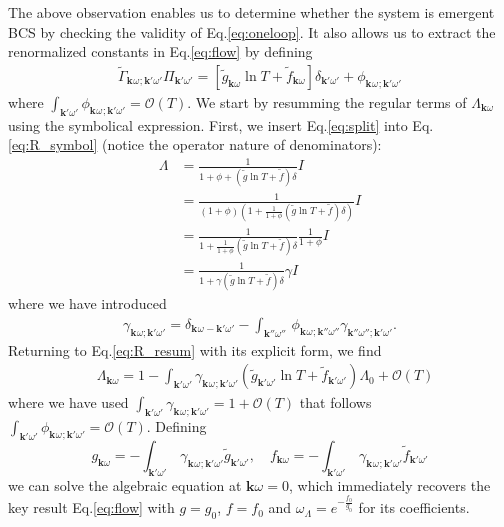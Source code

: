 \documentclass[%
 reprint,
superscriptaddress,
 amsmath,amssymb,
 aps,
prx,
]{revtex4-2}
\newcommand{\bk}{\mathbf{k}}
\newcommand{\Gammapp}{\tilde{\Gamma}}
\newcommand{\pcf}{\Lambda} %
\begin{document}
\begin{appendices}
The above observation enables us to determine whether the system is emergent BCS by
checking the validity of Eq.\eqref{eq:oneloop}. It also allows us to extract the renormalized
constants in Eq.\eqref{eq:flow} by defining 
\begin{gather}
	\label{eq:split}
	\Gammapp_{\bk^{}\omega^{};\bk'\omega'}\Pi_{\bk'\omega'}=\left[\tilde{g}_{\bk\omega} \ln T + \tilde{f}_{\bk\omega}\right] \delta_{\bk'\omega'} + \phi_{\bk^{}\omega^{};\bk'\omega'}
\end{gather}
where $ \int_{\bk'\omega'} \phi_{\bk^{}\omega^{};\bk'\omega'} = \mathcal O(T)$.
We start by resumming the regular terms of $\pcf_{\bk\omega}$ using the symbolical
expression. First, we insert Eq.\eqref{eq:split} into Eq.\eqref{eq:R_symbol}
(notice the operator nature of denominators): 
\begin{align}
	\pcf &=\frac{1}{1+\phi+(\tilde{g}\ln{T}+\tilde{f})\delta}I\nonumber\\ 
    &=\frac{1}{(1+\phi)\left(1+\frac{1}{1+\phi}(\tilde{g}\ln{T}+\tilde{f})\delta\right)}I\nonumber\\
  &=\frac{1}{1+\frac{1}{1+\phi}(\tilde{g}\ln{T}+\tilde{f})\delta}\frac{1}{1+\phi}I\nonumber\\
  &= \frac{1}{1+ \gamma (\tilde{g}\ln{T}+\tilde{f})\delta} \gamma I
  \label{eq:R_resum}  
\end{align}
where we have introduced
\begin{align}
\label{eq:gamma}
\gamma_{\bk^{}\omega; \bk'\omega'} =\delta_{\bk^{}\omega^{}-\bk'\omega'} -  \int_{\bk''\omega''} \, \phi_{\bk^{}\omega^{};\bk''\omega''}\gamma_{\bk''\omega'';\bk'\omega'}.
\end{align}
Returning to Eq.\eqref{eq:R_resum} with its explicit form, we find
\begin{align}
	\label{eq:LR_full}
	&\pcf_{\bk\omega}=1-\int_{\bk'\omega'} \gamma_{\bk^{}\omega^{};\bk'\omega'}\left(\tilde{g}_{\bk'\omega'}\ln {T}+ \tilde{f}_{\bk'\omega'}\right) \pcf_0 + \mathcal O(T)
\end{align}
where we have used $\int_{\bk'\omega'} \gamma_{\bk^{}\omega^{};\bk'\omega'} = 1+\mathcal O(T)$ that follows $ \int_{\bk'\omega'} \phi_{\bk^{}\omega^{};\bk'\omega'} = \mathcal O(T)$. Defining 
 \begin{equation}
\label{eq:R_final}
g_{\bk\omega} = -\int_{\bk'\omega'}\,  \gamma_{\bk^{}\omega^{};\bk'\omega'}\tilde{g}_{\bk'\omega'}, \quad  f_{\bk\omega} = -\int_{\bk'\omega'}\,  \gamma_{\bk^{}\omega^{};\bk'\omega'}\tilde{f}_{\bk'\omega'}
\end{equation}
we can solve the algebraic equation at $\bk\omega=0$, which immediately recovers the key
result Eq.\eqref{eq:flow} with $g = g_0$, $f = f_0$ and $\omega_\Lambda = e^{-\frac{f_0}{g_0}}$
for its coefficients. 


\end{appendices}
\end{document}
